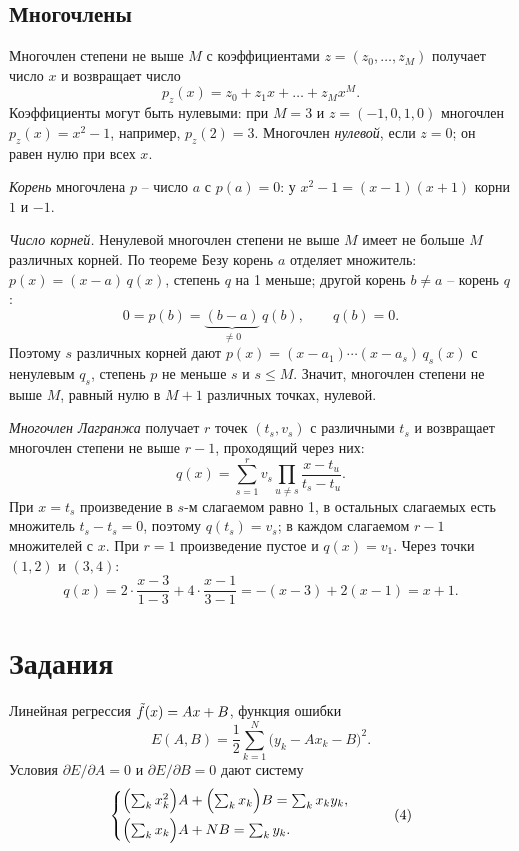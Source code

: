 \documentclass[12pt,a4paper]{article}
\begin{document}
\subsection{Многочлены}

Многочлен степени не выше $M$ с коэффициентами $z = (z_0, \dots, z_M)$
получает число $x$ и возвращает число
\[
  p_z(x) = z_0 + z_1x + \dots + z_Mx^M .
\]
Коэффициенты могут быть нулевыми: при $M = 3$ и $z = (-1, 0, 1, 0)$
многочлен $p_z(x) = x^2 - 1$, например, $p_z(2) = 3$. Многочлен
\emph{нулевой}, если $z = 0$; он равен нулю при всех $x$.

\emph{Корень} многочлена $p$ -- число $a$ с $p(a) = 0$: у
$x^2 - 1 = (x - 1)(x + 1)$ корни $1$ и $-1$.

\emph{Число корней.} Ненулевой многочлен степени не выше $M$ имеет не больше
$M$ различных корней. По теореме Безу корень $a$ отделяет множитель:
$p(x) = (x - a)\,q(x)$, степень $q$ на 1 меньше; другой корень $b \ne a$ --
корень $q$:
\[
  0 = p(b) = \underbrace{(b - a)}_{\ne 0}\,q(b), \qquad q(b) = 0 .
\]
Поэтому $s$ различных корней дают $p(x) = (x - a_1)\cdots(x - a_s)\,q_s(x)$ с
ненулевым $q_s$, степень $p$ не меньше $s$ и $s \le M$. Значит, многочлен
степени не выше $M$, равный нулю в $M + 1$ различных точках, нулевой.

\emph{Многочлен Лагранжа} получает $r$ точек $(t_s, v_s)$ с различными $t_s$ и
возвращает многочлен степени не выше $r - 1$, проходящий через них:
\[
  q(x) = \sum_{s=1}^{r} v_s\prod_{u \ne s}\frac{x - t_u}{t_s - t_u} .
\]
При $x = t_s$ произведение в $s$-м слагаемом равно 1, в остальных слагаемых
есть множитель $t_s - t_s = 0$, поэтому $q(t_s) = v_s$; в каждом слагаемом
$r - 1$ множителей с $x$. При $r = 1$ произведение пустое и $q(x) = v_1$.
Через точки $(1, 2)$ и $(3, 4)$:
\[
  q(x) = 2 \cdot \frac{x - 3}{1 - 3} + 4 \cdot \frac{x - 1}{3 - 1}
       = -(x - 3) + 2(x - 1) = x + 1 .
\]

\section{Задания}

\dano Линейная регрессия $\tilde{f}(x) = Ax + B$, функция ошибки
\[
  E(A,B) = \frac12\sum_{k=1}^{N}\bigl(y_k - Ax_k - B\bigr)^2 .
\]
Условия $\partial E/\partial A = 0$ и $\partial E/\partial B = 0$ дают систему
\begin{equation}\label{eq:lin}
  \begin{cases}
    \Bigl(\sum_k x_k^2\Bigr)A + \Bigl(\sum_k x_k\Bigr)B = \sum_k x_k y_k,\\[2mm]
    \Bigl(\sum_k x_k\Bigr)A + N B = \sum_k y_k .
  \end{cases}
  \tag{4}
\end{equation}
\end{document}
